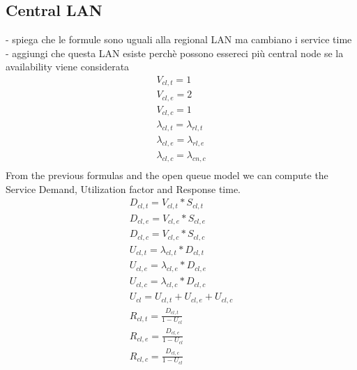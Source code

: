 \documentclass[11pt]{article}
\begin{document}
\subsection{Central LAN}
- spiega che le formule sono uguali alla regional LAN ma cambiano i service time
- aggiungi che questa LAN esiste perchè possono essereci più central node se la availability viene considerata
\begin{equation}
	\begin{array}{l}
		V_{cl, t} = 1 \\
		V_{cl, e} = 2 \\ %
		V_{cl,c} = 1 \\
		\lambda_{cl, t} = \lambda_{rl,t} \\
		\lambda_{cl, e} = \lambda_{rl,e} \\
		\lambda_{cl, c} = \lambda_{cn, c} \\
	\end{array}
\end{equation}
From the previous formulas and the open queue model we can compute the Service Demand, Utilization factor and Response time.
\begin{equation}
	\begin{array}{l}
		D_{cl, t} = V_{cl, t} * S_{cl, t} \\
		D_{cl, e} = V_{cl, e} * S_{cl, e} \\
		D_{cl, c} = V_{cl, c} * S_{cl, c} \\
		U_{cl, t} = \lambda_{cl, t} * D_{cl, t} \\
		U_{cl, e} = \lambda_{cl, e} * D_{cl, e} \\
		U_{cl, c} = \lambda_{cl, c} * D_{cl, c} \\
		U_{cl} = U_{cl, t} + U_{cl, e} + U_{cl, c} \\
		R_{cl, t} = \frac{D_{cl, t}}{1 - U_{cl}} \\
		R_{cl, e} = \frac{D_{cl, e}}{1 - U_{cl}} \\
		R_{cl, c} = \frac{D_{cl, c}}{1 - U_{cl}} \\
	\end{array}
\end{equation}
\end{document}
